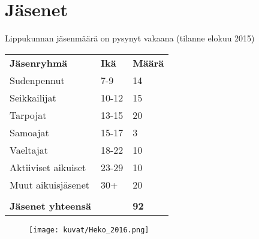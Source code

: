 \section{Jäsenet}
Lippukunnan jäsenmäärä on pysynyt vakaana (tilanne elokuu 2015)\\
\begin{center}
\begin{tabular}{ l l l }
	\textbf{Jäsenryhmä} & \textbf{Ikä} & \textbf{Määrä}\\
	Sudenpennut & 7-9 & 14\\
	Seikkailijat & 10-12 & 15\\
	Tarpojat & 13-15 & 20\\
	Samoajat & 15-17 & 3\\
	Vaeltajat & 18-22 & 10\\
	Aktiiviset aikuiset & 23-29 & 10\\
	Muut aikuisjäsenet & 30+ & 20\\
				   & & \\
	\textbf{Jäsenet yhteensä} & & \textbf{92}
\end{tabular}
\begin{figure}[htb]
	\begin{center}
		\texttt{[image: kuvat/Heko\_2016.png]}
	\end{center}
\end{figure}


\end{center}
